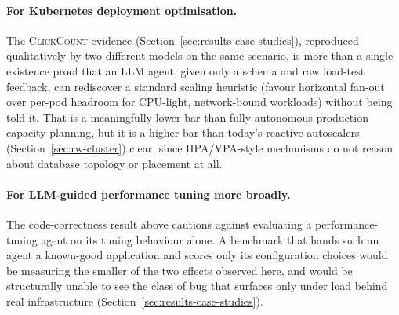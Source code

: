 \paragraph{For Kubernetes deployment optimisation.} The
\textsc{ClickCount} evidence (Section~\ref{sec:results-case-studies}), reproduced
qualitatively by two different models on the same scenario, is more than a
single existence proof that an LLM agent, given only a schema and raw
load-test feedback, can rediscover a standard scaling heuristic (favour
horizontal fan-out over per-pod headroom for CPU-light, network-bound
workloads) without being told it. That is a meaningfully lower bar than
fully autonomous production capacity planning, but it is a higher bar than
today's reactive autoscalers (Section~\ref{sec:rw-cluster}) clear, since
HPA/VPA-style mechanisms do not reason about database topology or
placement at all.

\paragraph{For LLM-guided performance tuning more broadly.} The
code-correctness result above cautions against evaluating a
performance-tuning agent on its tuning behaviour alone. A benchmark that
hands such an agent a known-good application and scores only its
configuration choices would be measuring the smaller of the two effects
observed here, and would be structurally unable to see the class of bug
that surfaces only under load behind real infrastructure
(Section~\ref{sec:results-case-studies}).
